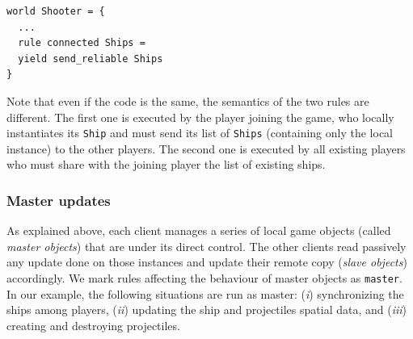 \begin{lstlisting}
world Shooter = {
  ...
  rule connected Ships =
  yield send_reliable Ships
}
\end{lstlisting}

Note that even if the code is the same, the semantics of the two rules are different. The first one is executed by the player joining the game, who locally instantiates its \texttt{Ship} and must send its list of \texttt{Ships} (containing only the local instance) to the other players. The second one is executed by all existing players who must share with the joining player the list of existing ships.


\subsubsection{Master updates}
As explained above, each client manages a series of local game objects (called \textit{master objects}) that are under its direct control. The other clients read passively any update done on those instances and update their remote copy  (\textit{slave objects}) accordingly. We mark rules affecting the behaviour of master objects as \texttt{master}. In our example, the following situations are run as master: (\textit{i}) synchronizing the ships among players, (\textit{ii}) updating the ship and projectiles spatial data, and (\textit{iii}) creating and destroying projectiles.

